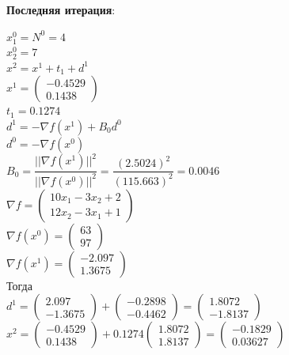\textbf{Последняя итерация}:

$x^{0}_{1} = N^{0} = 4$\\
$x^{0}_{2} = 7$\\
$x^{2} = x^{1} + t_{1} +d^{1}$\\
$
x^{1} = 
\begin{pmatrix}
  -0.4529\\
  0.1438
\end{pmatrix}
$\\
$t_{1} = 0.1274$\\
$d^{1} = -\nabla f(x^{1}) + B_{0}d^{0}$\\
$d^{0} = -\nabla f(x^{0})$\\
$B_{0} = \dfrac{||\nabla f(x^{1})||^{2}}{||\nabla f(x^{0})||^{2}} = \dfrac{(2.5024)^{2}}{(115.663)^{2}} = 0.0046$\\
$
\nabla f = 
\begin{pmatrix}
  10x_{1} - 3x_{2} + 2\\
  12x_{2} - 3x_{1} + 1
\end{pmatrix}
$\\
$
\nabla f(x^{0}) = 
\begin{pmatrix}
  63\\
  97
\end{pmatrix}
$\\
$
\nabla f(x^{1}) = 
\begin{pmatrix}
  -2.097\\
  1.3675
\end{pmatrix}
$\\
Тогда\\
$
d^{1} = 
\begin{pmatrix}
  2.097\\
  -1.3675
\end{pmatrix}
+
\begin{pmatrix}
  -0.2898\\
  -0.4462
\end{pmatrix}
=
\begin{pmatrix}
  1.8072\\
  -1.8137
\end{pmatrix}
$\\

$
x^{2} = 
\begin{pmatrix}
  -0.4529\\
  0.1438
\end{pmatrix}
+ 0.1274
\begin{pmatrix}
  1.8072\\
  1.8137
\end{pmatrix}
=
\begin{pmatrix}
  -0.1829\\
   0.03627
\end{pmatrix}
$
\pagebreak

